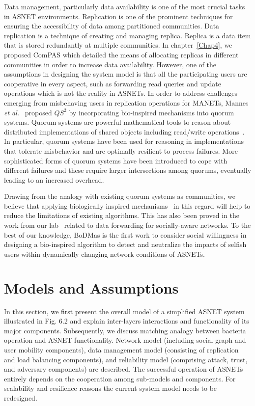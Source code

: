 Data management, particularly data availability is one of the most crucial tasks in ASNET environments. Replication is one of the prominent techniques for ensuring the accessibility of data among partitioned communities. Data replication is a technique of creating and managing replica. Replica is a data item that is stored redundantly at multiple communities. In chapter~\ref{Chap4}, we proposed ComPAS which detailed the means of allocating replicas in different communities in order to increase data availability. However, one of the assumptions in designing the system model is that all the participating users are cooperative in every aspect, such as forwarding read queries and update operations which is not the reality in ASNETs. In order to address challenges emerging from misbehaving users in replication operations for MANETs, Mannes {\it et al.}~\cite{EMannes2012} proposed $QS^2$ by incorporating bio-inspired mechanisms into quorum systems. Quorum systems are powerful mathematical tools to reason about distributed implementations of shared objects including read/write operations~\cite{JLuo2003}. In particular, quorum systems have been used for reasoning in implementations that tolerate misbehavior and are optimally resilient to process failures. More sophisticated forms of quorum systems have been introduced to cope with different failures and these require larger intersections among quorums, eventually leading to an increased overhead.

Drawing from the analogy with existing quorum systems as communities, we believe that applying biologically inspired mechanisms~\cite{SBalasubramaniam2011} in this regard will help to reduce the limitations of existing algorithms. This has also been proved in the work from our lab~\cite{FXia2014} related to data forwarding for socially-aware networks. To the best of our knowledge, BoDMas is the first work to consider social willingness in designing a bio-inspired algorithm to detect and neutralize the impacts of selfish users within dynamically changing network conditions of ASNETs.

\section{Models and Assumptions}\label{Chap6_03}
In this section, we first present the overall model of a simplified ASNET system illustrated in Fig. 6.2 and explain inter-layers interactions and functionality of its major components. Subsequently, we discuss matching analogy between bacteria operation and ASNET functionality. Network model (including social graph and user mobility components), data management model (consisting of replication and load balancing components), and reliability model (comprising attack, trust, and adversary components) are described. The successful operation of ASNETs entirely depends on the cooperation among sub-models and components. For scalability and resilience reasons the current system model needs to be redesigned.

